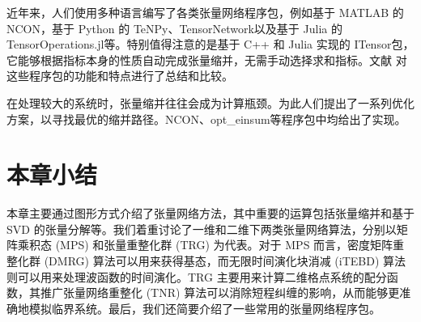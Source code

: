 近年来，人们使用多种语言编写了各类张量网络程序包，例如基于 MATLAB 的 NCON\cite{pfeifer2014ncon}，基于 Python 的 TeNPy\cite{hauschild2018efficient}、TensorNetwork\cite{roberts2019tensornetwork}以及基于 Julia 的 TensorOperations.jl\cite{jutho2023tensoroperations}等。特别值得注意的是基于 C++ 和 Julia 实现的 ITensor\cite{fishman2022itensor}包，它能够根据指标本身的性质自动完成张量缩并，无需手动选择求和指标。文献 \parencite{psarras2021landscape} 对这些程序包的功能和特点进行了总结和比较。

在处理较大的系统时，张量缩并往往会成为计算瓶颈。为此人们提出了一系列优化方案\cite{pfeifer2014faster,evenbly2014improving}，以寻找最优的缩并路径。NCON、opt\_einsum\cite{daniel2018opteinsum}等程序包中均给出了实现。

\section{本章小结}

本章主要通过图形方式介绍了张量网络方法，其中重要的运算包括张量缩并和基于 SVD 的张量分解等。我们着重讨论了一维和二维下两类张量网络算法，分别以矩阵乘积态 (MPS) 和张量重整化群 (TRG) 为代表。对于 MPS 而言，密度矩阵重整化群 (DMRG) 算法可以用来获得基态，而无限时间演化块消减 (iTEBD) 算法则可以用来处理波函数的时间演化。TRG 主要用来计算二维格点系统的配分函数，其推广张量网络重整化 (TNR) 算法可以消除短程纠缠的影响，从而能够更准确地模拟临界系统。最后，我们还简要介绍了一些常用的张量网络程序包。
